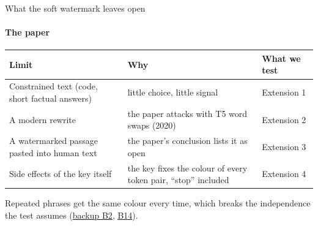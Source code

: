 \documentclass[aspectratio=169,10pt,t]{beamer}
\newcommand{\quiet}[1]{\textcolor{muted}{#1}}
\begin{document}
\begin{frame}{What the soft watermark leaves open}
  \framesubtitle{The paper}
  \vspace{0.4em}
  \begin{tabular}{@{}p{}p{}l@{}}
    \toprule
    Limit & Why & What we test \\
    \midrule
    \raggedright Constrained text (code, short factual answers) & \raggedright little choice, little signal & Extension 1 \\[0.3em]
    \raggedright A modern rewrite & \raggedright the paper attacks with T5 word swaps (2020) & Extension 2 \\[0.3em]
    \raggedright A watermarked passage pasted into human text & \raggedright the paper's conclusion lists it as open & Extension 3 \\[0.3em]
    \raggedright Side effects of the key itself & \raggedright the key fixes the colour of every token pair, ``stop'' included & Extension 4 \\
    \bottomrule
  \end{tabular}
  \vspace{1em}

  \quiet{Repeated phrases get the same colour every time, which breaks the independence the test assumes (\hyperlink{b2}{backup B2}, \hyperlink{b14}{B14}).}
\end{frame}

\end{document}
